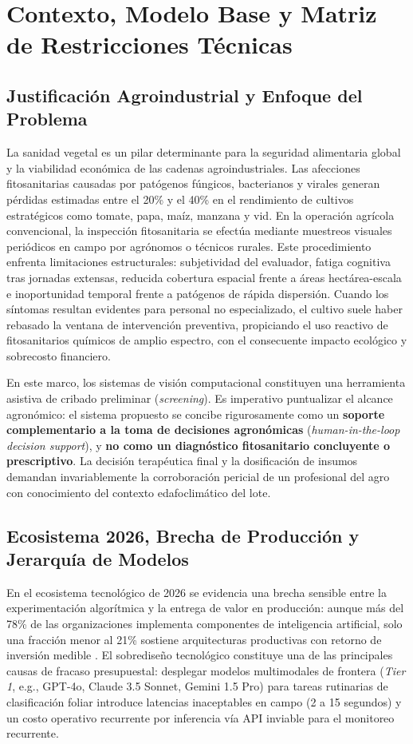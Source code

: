 \documentclass[12pt,letterpaper]{article}
\begin{document}
\section{Contexto, Modelo Base y Matriz de Restricciones Técnicas}

\subsection{Justificación Agroindustrial y Enfoque del Problema}
La sanidad vegetal es un pilar determinante para la seguridad alimentaria global y la viabilidad económica de las cadenas agroindustriales. Las afecciones fitosanitarias causadas por patógenos fúngicos, bacterianos y virales generan pérdidas estimadas entre el 20\% y el 40\% en el rendimiento de cultivos estratégicos como tomate, papa, maíz, manzana y vid. En la operación agrícola convencional, la inspección fitosanitaria se efectúa mediante muestreos visuales periódicos en campo por agrónomos o técnicos rurales. Este procedimiento enfrenta limitaciones estructurales: subjetividad del evaluador, fatiga cognitiva tras jornadas extensas, reducida cobertura espacial frente a áreas hectárea-escala e inoportunidad temporal frente a patógenos de rápida dispersión. Cuando los síntomas resultan evidentes para personal no especializado, el cultivo suele haber rebasado la ventana de intervención preventiva, propiciando el uso reactivo de fitosanitarios químicos de amplio espectro, con el consecuente impacto ecológico y sobrecosto financiero.

En este marco, los sistemas de visión computacional constituyen una herramienta asistiva de cribado preliminar (\textit{screening}). Es imperativo puntualizar el alcance agronómico: el sistema propuesto se concibe rigurosamente como un \textbf{soporte complementario a la toma de decisiones agronómicas} (\textit{human-in-the-loop decision support}), y \textbf{no como un diagnóstico fitosanitario concluyente o prescriptivo}. La decisión terapéutica final y la dosificación de insumos demandan invariablemente la corroboración pericial de un profesional del agro con conocimiento del contexto edafoclimático del lote.

\subsection{Ecosistema 2026, Brecha de Producción y Jerarquía de Modelos}
En el ecosistema tecnológico de 2026 se evidencia una brecha sensible entre la experimentación algorítmica y la entrega de valor en producción: aunque más del 78\% de las organizaciones implementa componentes de inteligencia artificial, solo una fracción menor al 21\% sostiene arquitecturas productivas con retorno de inversión medible \cite{mckinsey2025stateofai}. El sobrediseño tecnológico constituye una de las principales causas de fracaso presupuestal: desplegar modelos multimodales de frontera (\textit{Tier 1}, e.g., GPT-4o, Claude 3.5 Sonnet, Gemini 1.5 Pro) para tareas rutinarias de clasificación foliar introduce latencias inaceptables en campo (2 a 15 segundos) y un costo operativo recurrente por inferencia vía API inviable para el monitoreo recurrente.
\end{document}
